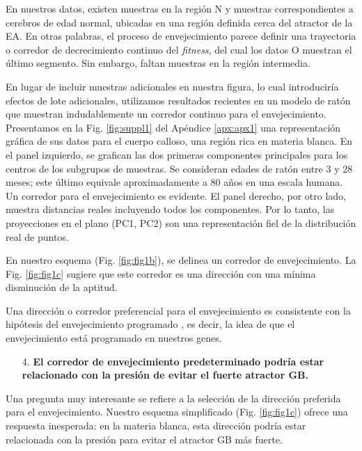 En nuestros datos, existen muestras en la región N y muestras correspondientes a cerebros de edad normal, ubicadas en una región definida cerca del atractor de la EA. En otras palabras, el proceso de envejecimiento parece definir una trayectoria o corredor de decrecimiento continuo del \textit{fitness}, del cual los datos O muestran el último segmento. Sin embargo, faltan muestras en la región intermedia.

En lugar de incluir muestras adicionales en nuestra figura, lo cual introduciría efectos de lote adicionales, utilizamos resultados recientes en un modelo de ratón \cite{hahn2023atlas} que muestran indudablemente un corredor continuo para el envejecimiento. Presentamos en la Fig. \ref{fig:suppl1} del Apéndice \ref{apx:apx1} una representación gráfica de sus datos para el cuerpo calloso, una región rica en materia blanca. En el panel izquierdo, se grafican las dos primeras componentes principales para los centros de los subgrupos de muestras. Se consideran edades de ratón entre 3 y 28 meses; este último equivale aproximadamente a 80 años en una escala humana. Un corredor para el envejecimiento es evidente. El panel derecho, por otro lado, muestra distancias reales incluyendo todos los componentes. Por lo tanto, las proyecciones en el plano (PC1, PC2) son una representación fiel de la distribución real de puntos.

En nuestro esquema (Fig. \ref{fig:fig1b}), se delinea un corredor de envejecimiento. La Fig. \ref{fig:fig1c} sugiere que este corredor es una dirección con una mínima disminución de la aptitud.

Una dirección o corredor preferencial para el envejecimiento es consistente con la hipótesis del envejecimiento programado \cite{Magalh_es_2012, Gems_2022}, es decir, la idea de que el envejecimiento está programado en nuestros genes.

\begin{enumerate}
	\item[4.] \textbf{El corredor de envejecimiento predeterminado podría estar relacionado con la presión de evitar el fuerte atractor GB.}
\end{enumerate}

Una pregunta muy interesante se refiere a la selección de la dirección preferida para el envejecimiento. Nuestro esquema simplificado (Fig. \ref{fig:fig1c}) ofrece una respuesta inesperada: en la materia blanca, esta dirección podría estar relacionada con la presión para evitar el atractor GB más fuerte.


